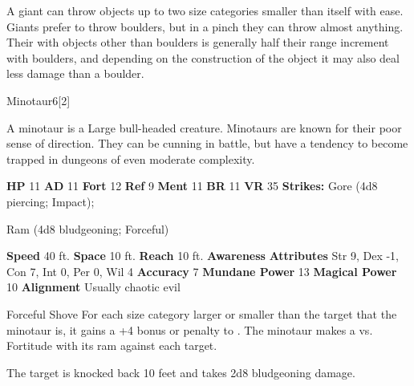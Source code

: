         A giant can throw objects up to two size categories smaller than itself with ease.
        Giants prefer to throw boulders, but in a pinch they can throw almost anything.
        Their  with objects other than boulders is generally half their range increment with boulders, and depending on the construction of the object it may also deal less damage than a boulder.
  
  
  \begin{monsection}{Minotaur}{6}[2]
    \vspace{-1em}\vspace{-1em}
    \vspace{0em}

    
        A minotaur is a Large bull-headed creature.
        Minotaurs are known for their poor sense of direction.
        They can be cunning in battle, but have a tendency to become trapped in dungeons of even moderate complexity.
      

    \begin{spellcontent}
      \begin{spelltargetinginfo}
        \pari \textbf{HP} 11 \monsep
          \textbf{AD} 11 \monsep
          \textbf{Fort} 12 \monsep
          \textbf{Ref} 9 \monsep
          \textbf{Ment} 11
        \pari \textbf{BR} 11 \monsep
        \textbf{VR} 35
        \pari \textbf{Strikes:}
            Gore  (4d8 piercing; Impact);
\par Ram  (4d8 bludgeoning; Forceful)
      \end{spelltargetinginfo}
    \end{spellcontent}
    \begin{monsterfooter}
      \pari \textbf{Speed} 40 ft. \monsep
        \textbf{Space} 10 ft. \monsep
        \textbf{Reach} 10 ft.
      \pari \textbf{Awareness} 
      \pari \textbf{Attributes}
        Str 9, Dex -1,
        Con 7, Int 0,
        Per 0, Wil 4
      \pari \textbf{Accuracy} 7 \monsep
        \textbf{Mundane Power} 13 \monsep
      \textbf{Magical Power} 10
      \pari \textbf{Alignment} Usually chaotic evil
    \end{monsterfooter}
  \end{monsection}
  \begin{freeability}{Forceful Shove}
      For each size category larger or smaller than the target that the minotaur is, it gains a +4 bonus or penalty to . The minotaur makes a 
         vs. Fortitude
        with its ram against each target.
    
    \hit The target is knocked back 10 feet and takes 2d8 bludgeoning damage.
    \end{freeability}
  

